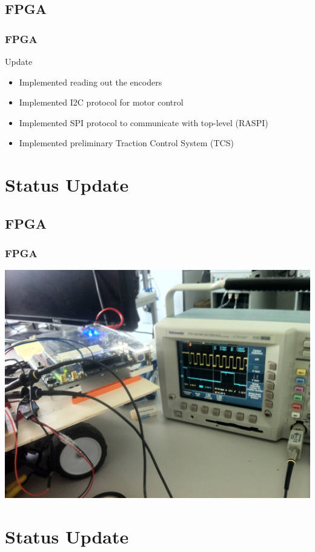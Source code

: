 \documentclass[pdf]{beamer}
\begin{document}
\subsection{FPGA}
\begin{frame}
\frametitle{FPGA}
\begin{exampleblock}{Update}
\begin{itemize}
  \item Implemented reading out the encoders
  \item Implemented I2C protocol for motor control
  \item Implemented SPI protocol to communicate with top-level (RASPI)
  \item Implemented preliminary Traction Control System (TCS) 
\end{itemize}
\end{exampleblock}
\end{frame}

\section{Status Update}
\subsection{FPGA}
\begin{frame}
\frametitle{FPGA}
  \begin{center}
  \includegraphics[width = \textwidth]{pics/i2c_am_oszi.JPG}
  \end{center}
\end{frame}

\section{Status Update}
\end{document}
